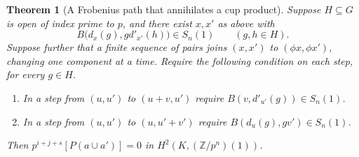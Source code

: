 \documentclass[a4paper,11pt]{article}
\newtheorem{theorem}[proposition]{Theorem}
\theoremstyle{definition}
\theoremstyle{remark}
\newcommand{\ZZ}{\mathbb Z}\newcommand{\ord}{\operatorname{ord}}
\numberwithin{equation}{section}
\begin{document}
\begin{theorem}[A Frobenius path that annihilates a cup product]
\leavevmode\label{thm:cuppath757}
Suppose \(H\subseteq G\) is open of index prime to \(p\), and
there exist \(x,x'\) as above with
\[
     B\big(d_x(g),g d'_{x'}(h)\big)\in S_n(1)
                                 \qquad(g,h\in H).
\]
Suppose further that a finite sequence of pairs joins
\((x,x')\) to \((\phi x,\phi x')\), changing one component
at a time. Require the following condition on each step,
for every \(g\in H\).
\begin{enumerate}
\item In a step from \((u,u')\) to \((u+v,u')\) require
\(B(v,d'_{u'}(g))\in S_n(1)\).
\item In a step from \((u,u')\) to \((u,u'+v')\) require
\(B(d_u(g),gv')\in S_n(1)\).
\end{enumerate}
Then \(p^{i+j+s}[P(a\cup a')]=0\) in
\(H^2(K,(\ZZ/p^n)(1))\).
\end{theorem}
\end{document}
